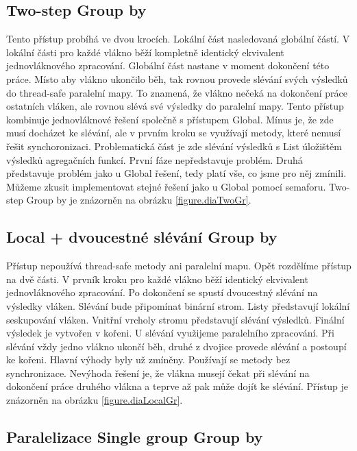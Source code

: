 \subsection{Two-step Group by} \label{anal.groupby.twostep}

Tento přístup probíhá ve dvou krocích.
Lokální část nasledovaná globální částí. 
V lokální části pro každé vlákno běží kompletně identický ekvivalent jednovláknového zpracování.
Globální část nastane v moment dokončení této práce.
Místo aby vlákno ukončilo běh, tak rovnou provede slévání svých výsledků do thread-safe paralelní mapy.
To znamená, že vlákno nečeká na dokončení práce ostatních vláken, ale rovnou slévá své výsledky do paralelní mapy.
Tento přístup kombinuje jednovláknové řešení společně s přístupem Global.
Mínus je, že zde musí docházet ke slévání, ale v prvním kroku se využívají metody, které nemusí řešit synchoronizaci. 
Problematická část je zde slévání výsledků s List úložištěm výsledků agregačních funkcí.
První fáze nepředstavuje problém. 
Druhá představuje problém jako u Global řešení, tedy platí vše, co jsme pro něj zmínili.
Můžeme zkusit implementovat stejné řešení jako u Global pomocí semaforu.
Two-step Group by je znázorněn na obrázku \ref{figure.diaTwoGr}.

\subsection{Local + dvoucestné slévání Group by} \label{anal.groupby.local}

Přístup nepoužívá thread-safe metody ani paralelní mapu.
Opět rozdělíme přístup na dvě části.
V prvník kroku pro každé vlákno běží identický ekvivalent jednovláknového zpracování.
Po dokončení se spustí dvoucestný slévání na výsledky vláken.
Slévání bude připomínat binární strom.
Listy představují lokální seskupování vláken.
Vnitřní vrcholy stromu představují slévání výsledků.
Finální výsledek je vytvořen v kořeni.
U slévání využijeme paralelního zpracování.
Při slévání vždy jedno vlákno ukončí běh, druhé z dvojice provede slévání a postoupí ke kořeni. 
Hlavní výhody byly už zmíněny.
Používají se metody bez synchronizace.
Nevýhoda řešení je, že vlákna musejí čekat při slévání na dokončení práce druhého vlákna a teprve až pak může dojít ke slévání.
Přístup je znázorněn na obrázku \ref{figure.diaLocalGr}.

\subsection{Paralelizace Single group Group by}

